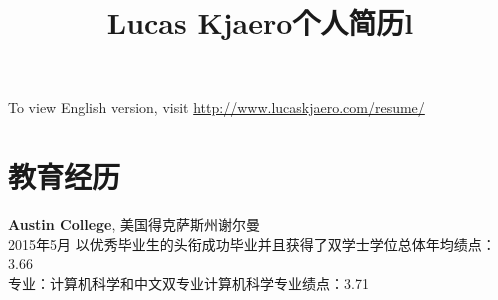 \documentclass[margin]{res}
\title{Lucas Kjaero个人简历}
\begin{document}
\begin{CJK*}{UTF8}{gbsn}



\address{电话号码：+1 \(619\) 905-1772\\永久住址： San Diego, CA 92123}
\address{邮箱地址：\href{mailto:lucas@lucaskjaero.com}{Lucas@LucasKjaero.com}\\个人网址：\href{http://www.lucaskjaero.com}{www.LucasKjaero.com}}


\begin{resume}

 
\section{}  
To view English version, visit \href{http://www.lucaskjaero.com/resume/}{http://www.lucaskjaero.com/resume/}

\section{教育经历}
\textbf{Austin College}, 美国得克萨斯州谢尔曼\\
2015年5月 以优秀毕业生的头衔成功毕业并且获得了双学士学位\hfill 总体年均绩点： 
3.66\\
专业：计算机科学和中文双专业\hfill 计算机科学专业绩点：3.71

\begin{format}
\title{l}\\
\\
\body\\
\end{format}


\end{resume}
\end{CJK*}
\end{document}
